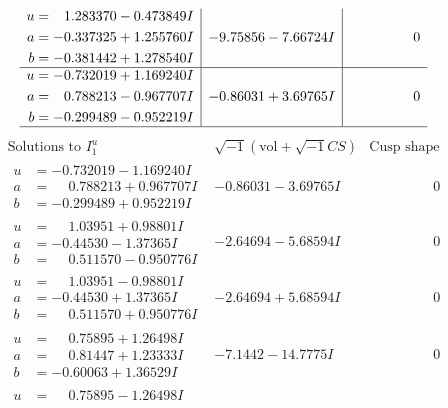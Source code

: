 \documentclass[1p]{elsarticle_modified}
\theoremstyle{definition}
\newcommand{\I}{\sqrt{-1}}
\begin{document}
$$\begin{array}{c|c|c}
\begin{aligned}
u &= \phantom{-}1.283370 - 0.473849 I \\
a &= -0.337325 + 1.255760 I \\
b &= -0.381442 + 1.278540 I\end{aligned}
 & -9.75856 - 7.66724 I & \phantom{-0.000000 } 0 \\ \hline\begin{aligned}
u &= -0.732019 + 1.169240 I \\
a &= \phantom{-}0.788213 - 0.967707 I \\
b &= -0.299489 - 0.952219 I\end{aligned}
 & -0.86031 + 3.69765 I & \phantom{-0.000000 } 0\\
 \hline 
 \end{array}$$\newpage$$\begin{array}{c|c|c}  
\text{Solutions to }I^u_{1}& \I (\text{vol} + \sqrt{-1}CS) & \text{Cusp shape}\\
 \hline 
\begin{aligned}
u &= -0.732019 - 1.169240 I \\
a &= \phantom{-}0.788213 + 0.967707 I \\
b &= -0.299489 + 0.952219 I\end{aligned}
 & -0.86031 - 3.69765 I & \phantom{-0.000000 } 0 \\ \hline\begin{aligned}
u &= \phantom{-}1.03951 + 0.98801 I \\
a &= -0.44530 - 1.37365 I \\
b &= \phantom{-}0.511570 - 0.950776 I\end{aligned}
 & -2.64694 - 5.68594 I & \phantom{-0.000000 } 0 \\ \hline\begin{aligned}
u &= \phantom{-}1.03951 - 0.98801 I \\
a &= -0.44530 + 1.37365 I \\
b &= \phantom{-}0.511570 + 0.950776 I\end{aligned}
 & -2.64694 + 5.68594 I & \phantom{-0.000000 } 0 \\ \hline\begin{aligned}
u &= \phantom{-}0.75895 + 1.26498 I \\
a &= \phantom{-}0.81447 + 1.23333 I \\
b &= -0.60063 + 1.36529 I\end{aligned}
 & -7.1442 - 14.7775 I & \phantom{-0.000000 } 0 \\ \hline\begin{aligned}
u &= \phantom{-}0.75895 - 1.26498 I \\

\end{aligned}
\end{array}$$
\end{document}
